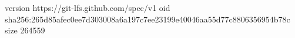 version https://git-lfs.github.com/spec/v1
oid sha256:265d85afec0ee7d303008a6a197c7ee23199e40046aa55d77c8806356954b78c
size 264559
